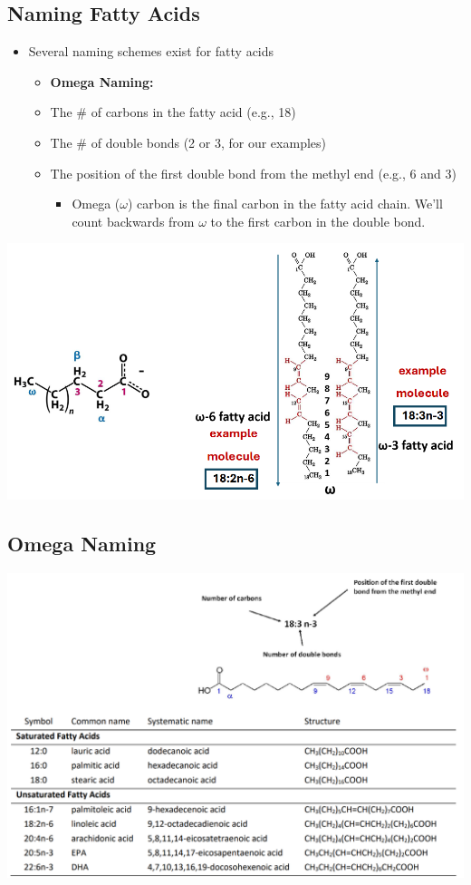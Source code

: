 \documentclass[10pt]{article}
\begin{document}
\subsection*{Naming Fatty Acids}
\begin{itemize}
    \item Several naming schemes exist for fatty acids
    \begin{itemize}
        \item \textbf{Omega Naming:}
        \item The \# of carbons in the fatty acid (e.g., 18)
        \item The \# of double bonds (2 or 3, for our examples)
        \item The position of the first double bond from the methyl end (e.g., 6 and 3)
        \begin{itemize}
            \item Omega ($\omega$) carbon is the final carbon in the fatty acid chain.  We'll count backwards from $\omega$ to the first carbon in the double bond.
        \end{itemize}
    \end{itemize}
\end{itemize}
\begin{center}
    \includegraphics*[width=\textwidth]{L2_8.png}
\end{center}

\subsection*{Omega Naming}
\begin{center}
    \includegraphics*[width=\textwidth]{L2_9.png}
\end{center}
\end{document}
